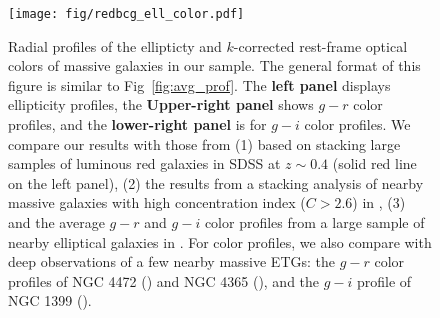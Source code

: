 \documentclass[a4paper,fleqn,usenatbib]{mnras}
\begin{document}
  \begin{figure}
      \centering 
      \texttt{[image: fig/redbcg\_ell\_color.pdf]}
      \caption{
          Radial profiles of the ellipticty and $k$-corrected rest-frame optical colors 
          of massive galaxies in our sample. 
          The general format of this figure is similar to Fig~\ref{fig:avg_prof}.  
          The \textbf{left panel} displays ellipticity profiles, 
          the \textbf{Upper-right panel} shows $g-r$ color profiles, and  the
          \textbf{lower-right panel} is for $g-i$ color profiles. 
          We compare our results with those from (1) \citet{Tal2011} based on stacking 
          large samples of luminous red galaxies in SDSS at $z{\sim} 0.4$ 
          (solid red line on the left panel), 
          (2) the results from a stacking analysis of nearby massive 
          galaxies with high concentration index ($C>2.6$) in 
          \citet[][blue dash lines on the left and upper-right panels]{DSouza2014}, 
          (3) and the average $g-r$ and $g-i$ color profiles 
          from a large sample of nearby elliptical galaxies in \citet[][blue, solid 
          lines on both right panels]{LaBarbera2010}.
          For color profiles, we also compare with deep observations of a few nearby 
          massive ETGs: the $g-r$ color profiles of NGC 4472 (\citealt{Mihos2013}) 
          and NGC 4365 (\citealt{Mihos2017}), and the $g-i$ profile of NGC 1399 
          (\citealt{Iodice2016}).
          }
      \label{fig:ell_color}
  \end{figure}
    
\end{document}
